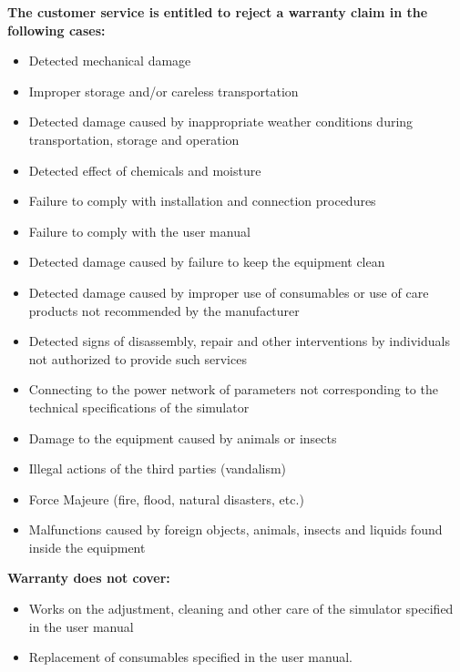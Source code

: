 {    \textbf{The customer service is entitled to reject a warranty claim in the following cases:}
    \begin{itemize}
    \renewcommand{\labelitemi}{\bf--}
        \item Detected mechanical damage 
        \item Improper storage and/or careless transportation
        \item Detected damage caused by inappropriate weather conditions during transportation, storage and operation
        \item Detected effect of chemicals and moisture
        \item Failure to comply with installation and connection procedures
        \item Failure to comply with the user manual
        \item Detected damage caused by failure to keep the equipment clean
        \item Detected damage caused by improper use of consumables or use of care products not recommended by the manufacturer
        \item Detected signs of disassembly, repair and other interventions by individuals not authorized to provide such services
        \item Connecting to the power network of parameters not corresponding to the technical specifications of the simulator
        \item Damage to the equipment caused by animals or insects
        \item Illegal actions of the third parties (vandalism)
        \item Force Majeure (fire, flood, natural disasters, etc.)
        \item Malfunctions caused by foreign objects, animals, insects and liquids found inside the equipment
    \end{itemize}

    \textbf{Warranty does not cover:}
    \begin{itemize}
        \renewcommand{\labelitemi}{\bf--}
        \item Works on the adjustment, cleaning and other care of the simulator specified in the user manual
        \item Replacement of consumables specified in the user manual.    
    \end{itemize}

}
